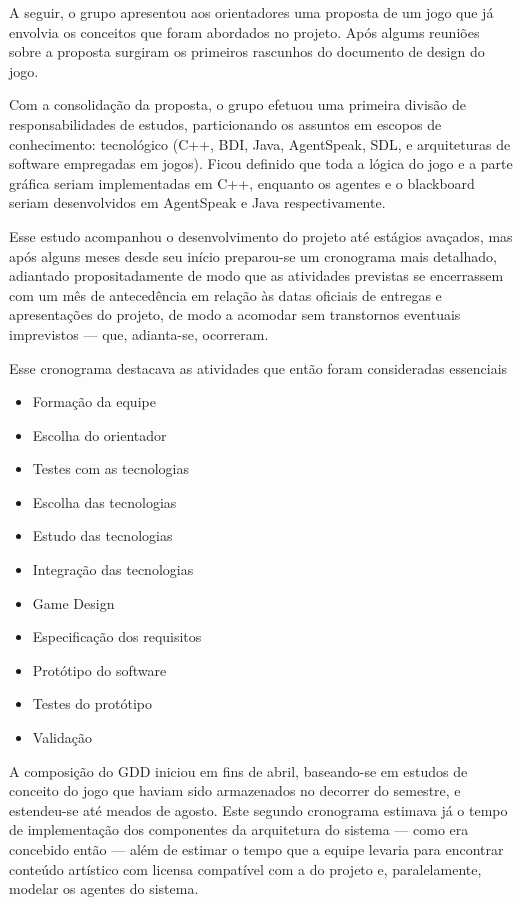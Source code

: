A seguir, o grupo apresentou aos orientadores uma proposta de um jogo que já envolvia os conceitos que foram abordados no projeto. Após algums reuniões sobre a proposta surgiram os primeiros rascunhos do documento de design do jogo.

Com a consolidação da proposta, o grupo efetuou uma primeira divisão de responsabilidades de estudos, particionando os assuntos em escopos de conhecimento: tecnológico (C++, BDI, Java, AgentSpeak, SDL, e arquiteturas de software empregadas em jogos).
Ficou definido que toda a lógica do jogo e a parte gráfica seriam implementadas em C++, enquanto os agentes e o blackboard seriam desenvolvidos em AgentSpeak e Java respectivamente.

Esse estudo acompanhou o desenvolvimento do projeto até estágios avaçados, mas após alguns meses desde seu início preparou-se um cronograma mais detalhado, adiantado propositadamente de modo que as atividades previstas se encerrassem com um mês de antecedência em relação às datas oficiais de entregas e apresentações do projeto, de modo a acomodar sem transtornos eventuais imprevistos --- que, adianta-se, ocorreram.

Esse cronograma destacava as atividades que então foram consideradas essenciais
\begin{itemize}
\item Formação da equipe
\item Escolha do orientador
\item Testes com as tecnologias
\item Escolha das tecnologias
\item Estudo das tecnologias
\item Integração das tecnologias
\item Game Design
\item Especificação dos requisitos
\item Protótipo do software
\item Testes do protótipo
\item Validação
\end{itemize}

A composição do GDD iniciou em fins de abril, baseando-se em estudos de conceito do jogo que haviam sido armazenados no decorrer do semestre, e estendeu-se até meados de agosto. Este segundo cronograma estimava já o tempo de implementação dos componentes da arquitetura do sistema --- como era concebido então --- além de estimar o tempo que a equipe levaria para encontrar conteúdo artístico com licensa compatível com a do projeto e, paralelamente, modelar os agentes do sistema.

